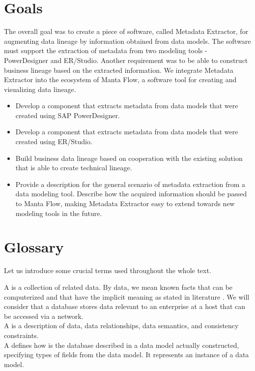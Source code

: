 \section{Goals}

The overall goal was to create a piece of software, called Metadata Extractor, for augmenting data lineage by information obtained from data models. The software must support the extraction of metadata from two modeling tools - PowerDesigner and ER/Studio. Another requirement was to be able to construct business lineage based on the extracted information.
We integrate Metadata Extractor into the ecosystem of Manta Flow, a software tool for creating and visualizing data lineage.

\begin{itemize}
	\item Develop a component that extracts metadata from data models that were created using SAP PowerDesigner.
	\item Develop a component that extracts metadata from data models that were created using ER/Studio.
	\item Build business data lineage based on cooperation with the existing solution that is able to create technical lineage.
	\item Provide a description for the general scenario of metadata extraction from a data modeling tool. Describe how the acquired information should be passed to Manta Flow, making Metadata Extractor easy to extend towards new modeling tools in the future.
\end{itemize}

\section{Glossary}
Let us introduce some crucial terms used throughout the whole text.

A  is a collection of related data. By data, we mean known facts that can be computerized and that have the implicit meaning as stated in literature \cite{ElmasryNavathe15}. We will consider that a database stores data relevant to an enterprise at a host that can be accessed via a network. \\

A  is a description of data, data relationships, data semantics, and consistency constraints. \label{DataModel} \\

A  defines how is the database described in a data model actually constructed, specifying types of fields from the data model. It represents an instance of a data model. \\

